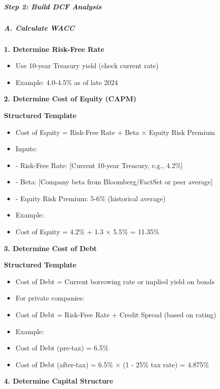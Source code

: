 \documentclass[11pt]{article}
\begin{document}
\subparagraph{Step 2: Build DCF Analysis}\mbox{}\par

\subparagraph{A. Calculate WACC}\mbox{}\par

\textbf{1. Determine Risk-Free Rate}

\begin{itemize}[leftmargin=*,itemsep=2pt,topsep=2pt]
\item {} Use 10-year Treasury yield (check current rate)
\item {} Example: 4.0-4.5\% as of late 2024
\end{itemize}

\textbf{2. Determine Cost of Equity (CAPM)}

\textbf{Structured Template}
\begin{itemize}[leftmargin=*,itemsep=2pt,topsep=2pt]
\item {} Cost of Equity = Risk-Free Rate + Beta × Equity Risk Premium
\item {} Inputs:
\item {} - Risk-Free Rate: [Current 10-year Treasury, e.g., 4.2\%]
\item {} - Beta: [Company beta from Bloomberg/FactSet or peer average]
\item {} - Equity Risk Premium: 5-6\% (historical average)
\item {} Example:
\item {} Cost of Equity = 4.2\% + 1.3 × 5.5\% = 11.35\%
\end{itemize}

\textbf{3. Determine Cost of Debt}

\textbf{Structured Template}
\begin{itemize}[leftmargin=*,itemsep=2pt,topsep=2pt]
\item {} Cost of Debt = Current borrowing rate or implied yield on bonds
\item {} For private companies:
\item {} Cost of Debt = Risk-Free Rate + Credit Spread (based on rating)
\item {} Example:
\item {} Cost of Debt (pre-tax) = 6.5\%
\item {} Cost of Debt (after-tax) = 6.5\% × (1 - 25\% tax rate) = 4.875\%
\end{itemize}

\textbf{4. Determine Capital Structure}
\end{document}
